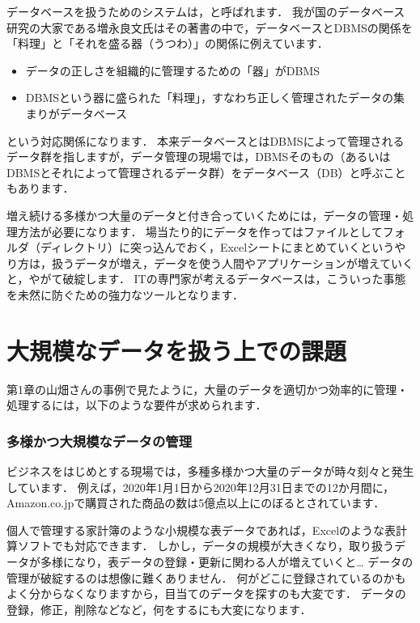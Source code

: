 データベースを扱うためのシステムは，と呼ばれます．
我が国のデータベース研究の大家である増永良文氏はその著書の中で，データベースとDBMSの関係を「料理」と「それを盛る器（うつわ）」の関係に例えています\cite{増永本}．
\begin{itemize}
\item データの正しさを組織的に管理するための「器」がDBMS
\item DBMSという器に盛られた「料理」，すなわち正しく管理されたデータの集まりがデータベース
\end{itemize}
という対応関係になります．
本来データベースとはDBMSによって管理されるデータ群を指しますが，データ管理の現場では，DBMSそのもの（あるいはDBMSとそれによって管理されるデータ群）をデータベース（DB）と呼ぶこともあります．

増え続ける多様かつ大量のデータと付き合っていくためには，データの管理・処理方法が必要になります．
場当たり的にデータを作ってはファイルとしてフォルダ（ディレクトリ）に突っ込んでおく，Excelシートにまとめていくというやり方は，扱うデータが増え，データを使う人間やアプリケーションが増えていくと，やがて破綻します．
ITの専門家が考えるデータベースは，こういった事態を未然に防ぐための強力なツールとなります．


\section{大規模なデータを扱う上での課題}
第1章の山畑さんの事例で見たように，大量のデータを適切かつ効率的に管理・処理するには，以下のような要件が求められます．

\subsubsection{多様かつ大規模なデータの管理}
ビジネスをはじめとする現場では，多種多様かつ大量のデータが時々刻々と発生しています．
例えば，2020年1月1日から2020年12月31日までの12か月間に，Amazon.co.jpで購買された商品の数は5億点以上にのぼるとされています\cite{DataVolumeOfAmazon}．

個人で管理する家計簿のような小規模な表データであれば，Excelのような表計算ソフトでも対応できます．
しかし，データの規模が大きくなり，取り扱うデータが多様になり，表データの登録・更新に関わる人が増えていくと…
データの管理が破綻するのは想像に難くありません．
何がどこに登録されているのかもよく分からなくなりますから，目当てのデータを探すのも大変です．
データの登録，修正，削除などなど，何をするにも大変になります．

